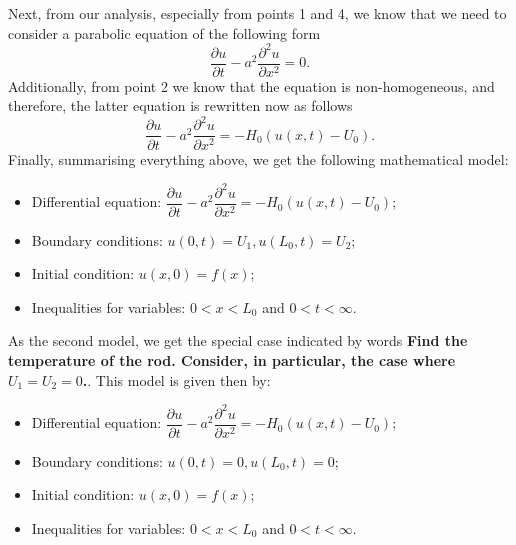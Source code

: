 Next, from our analysis, especially from points 1 and 4, we know that we need to consider a parabolic equation of the following form
\begin{equation*}
\frac{\partial u}{\partial t} - a^{2}\frac{\partial^{2} u}{\partial x^{2}} = 0.
\end{equation*}
Additionally, from point 2 we know that the equation is non-homogeneous, and therefore, the latter equation is rewritten now as follows
\begin{equation*}
\frac{\partial u}{\partial t} - a^{2}\frac{\partial^{2} u}{\partial x^{2}} = -H_{0}(u(x,t)-U_{0}).
\end{equation*}
Finally, summarising everything above, we get the following mathematical model:
\begin{itemize}
\item Differential equation: $\dfrac{\partial u}{\partial t} - a^{2}\dfrac{\partial^{2} u}{\partial x^{2}} = -H_{0}(u(x,t)-U_{0})$;
\item Boundary conditions: $u(0,t) = U_{1}, u(L_{0},t) = U_{2}$;
\item Initial condition: $u(x,0)=f(x)$;
\item Inequalities for variables: $0<x<L_{0}$ and $0<t<\infty$.
\end{itemize}
As the second model, we get the special case indicated by words {\bfseries Find the temperature of the rod. Consider, in particular, the case where $U_{1}=U_{2}=0$.}. This model is given then by:
\begin{itemize}
\item Differential equation: $\dfrac{\partial u}{\partial t} - a^{2}\dfrac{\partial^{2} u}{\partial x^{2}} = -H_{0}(u(x,t)-U_{0})$;
\item Boundary conditions: $u(0,t) = 0, u(L_{0},t) = 0$;
\item Initial condition: $u(x,0)=f(x)$;
\item Inequalities for variables: $0<x<L_{0}$ and $0<t<\infty$.
\end{itemize}



